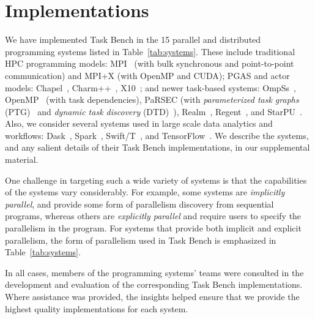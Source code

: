 \section{Implementations}
\label{sec:implementation}



We have implemented Task Bench in the 15 parallel and distributed
programming systems listed in Table~\ref{tab:systems}. These include
traditional HPC programming models: MPI~\cite{MPI} (with bulk
synchronous and point-to-point communication) and MPI+X (with OpenMP
and CUDA); PGAS and actor models: Chapel~\cite{Chapel15},
Charm++~\cite{Charmpp93}, X10~\cite{X1005}; and newer task-based
systems: OmpSs~\cite{OmpSs11}, OpenMP~\cite{OpenMPSpec40} (with task
dependencies), PaRSEC (with \emph{parameterized task graphs}
(PTG)~\cite{PARSEC13} and \emph{dynamic task discovery}
(DTD)~\cite{PARSEC_DTD}), Realm~\cite{Realm14},
Regent~\cite{Regent15}, and StarPU~\cite{StarPU11}. Also, we consider
several systems used in large scale data analytics and workflows:
Dask~\cite{Dask15}, Spark~\cite{Spark10}, Swift/T~\cite{Wozniak13},
and TensorFlow~\cite{TensorFlow15}. We describe the systems, and any
salient details of their Task Bench implementations, in our
supplemental material.

One challenge in targeting such a wide variety of
systems is that the capabilities of the systems vary considerably. For
example, some systems are \emph{implicitly parallel}, and provide some
form of parallelism discovery from sequential programs, whereas others
are \emph{explicitly parallel} and require users to specify the
parallelism in the program. For systems that provide both implicit and explicit parallelism, the form of parallelism used in Task Bench is emphasized in Table~\ref{tab:systems}.



In all cases, members of the programming systems' teams
were consulted in the development and evaluation of the
corresponding Task Bench implementations. Where assistance was provided, the insights helped ensure that we provide the highest quality implementations for each system.
